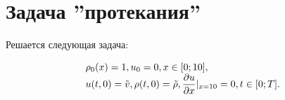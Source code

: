 \section{Задача ''протекания''}

Решается следующая задача:

\begin{equation} \label{p3}
    \begin{array}{l}
        \rho_0(x) = 1, u_0 = 0, x \in [0;10],\\
        u(t,0) = \tilde{v}, \rho(t, 0) = \tilde{\rho}, \dfrac{\partial u}{\partial x}\vert_{x=10} = 0, t \in [0; T]. 
    \end{array}
\end{equation}


